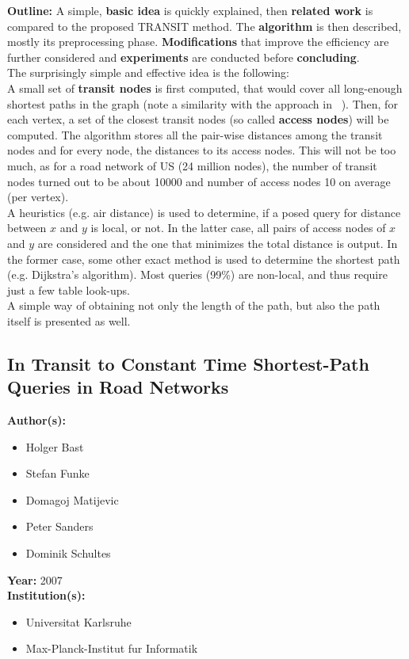 \documentclass[a4paper]{article}
\newenvironment{itemizesp}
{
    \begin{itemize}
}
{
    \end{itemize}
}
\newcommand{\textbff}[1]{{\large \textbf{#1}}}
\begin{document}
        \textbff{Outline:} A simple, \textbf{basic idea} is quickly explained, then \textbf{related work} is compared to the proposed TRANSIT method. The \textbf{algorithm} is then described, mostly its preprocessing phase. \textbf{Modifications} that improve the efficiency are further considered and \textbf{experiments} are conducted before \textbf{concluding}. \\

        The surprisingly simple and effective idea is the following: \\

        A small set of \textbf{transit nodes} is first computed, that would cover all long-enough shortest paths in the graph (note a similarity with the approach in ~\cite{highwaydim10}). Then, for each vertex, a set of the closest transit nodes (so called \textbf{access nodes}) will be computed. The algorithm stores all the pair-wise distances among the transit nodes and for every node, the distances to its access nodes. This will not be too much, as for a road network of US (24 million nodes), the number of transit nodes turned out to be about 10000 and number of access nodes 10 on average (per vertex). \\

        A heuristics (e.g. air distance) is used to determine, if a posed query for distance between $x$ and $y$ is local, or not. In the latter case, all pairs of access nodes of $x$ and $y$ are considered and the one that minimizes the total distance is output. In the former case, some other exact method is used to determine the shortest path (e.g. Dijkstra's algorithm). Most queries (99\%) are non-local, and thus require just a few table look-ups. \\

        A simple way of obtaining not only the length of the path, but also the path itself is presented as well. \\

        \subsection{In Transit to Constant Time Shortest-Path Queries in Road Networks}
        \label{subsec:transithh}

        \textbff{Author(s): }
        \begin{itemizesp}
            \item Holger Bast
            \item Stefan Funke
            \item Domagoj Matijevic
            \item Peter Sanders
            \item Dominik Schultes
        \end{itemizesp}
        \textbff{Year: } 2007 \\
        \textbff{Institution(s): } \\
        \begin{itemizesp}
            \item Universitat Karlsruhe
            \item Max-Planck-Institut fur Informatik
        \end{itemizesp}
\end{document}
